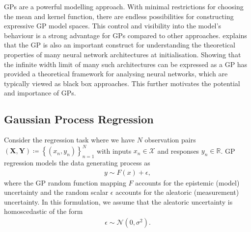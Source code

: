 \documentclass{article}
\numberwithin{equation}{section}
\begin{document}
GPs are a powerful modelling approach. With minimal restrictions for choosing the mean and kernel function, there are endless possibilities for constructing expressive GP model spaces.
This control and visibility into the model's behaviour is a strong advantage for GPs compared to other approaches.
\cite{novak2019neural} explains that the GP is also an important construct for understanding the theoretical properties of many neural network architectures at initialisation.
Showing that the infinite width limit of many such architectures can be expressed as a GP has provided a theoretical framework for analysing neural networks, which are typically viewed as black box approaches.
This further motivates the potential and importance of GPs.

\subsection{Gaussian Process Regression}
Consider the regression task where we have $N$ observation pairs $(\mathbf{X}, \mathbf{Y}) \coloneqq \left\{(x_n, y_n)\right\}_{n=1}^{N}$ with inputs $x_n \in \mathcal{X}$ and responses $y_n \in \mathbb{R}$. GP regression models the data generating process as
\begin{align}
    y \sim F(x) + \epsilon,
    \label{regression-data-uncertainties}
\end{align}
where the GP random function mapping $F$ accounts for the epistemic (model) uncertainty and the random scalar $\epsilon$ accounts for the aleatoric (measurement) uncertainty. In this formulation, we assume that the aleatoric uncertainty is homoscedastic of the form
\begin{align}
    \epsilon \sim \mathcal{N} \left(0, \sigma^2\right).
    \label{aleotric-uncertainty}
\end{align}
\end{document}
